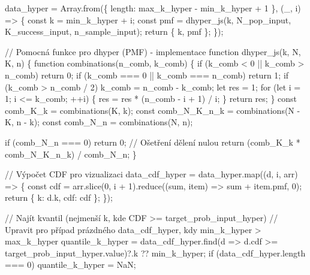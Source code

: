 \documentclass[
  czech,
  11pt,
  letterpaper,
  DIV=11,
  numbers=noendperiod]{scrreprt}
\newenvironment{Shaded}{\begin{snugshade}}{\end{snugshade}}
\newcommand{\NormalTok}[1]{\textcolor[rgb]{0.00,0.23,0.31}{#1}}
\begin{document}
\begin{tcolorbox}
\begin{Shaded}
\begin{Highlighting}[]
\NormalTok{data\_hyper = Array.from(\{ length: max\_k\_hyper {-} min\_k\_hyper + 1 \}, (\_, i) =\textgreater{} \{}
\NormalTok{  const k = min\_k\_hyper + i;}
\NormalTok{  const pmf = dhyper\_js(k, N\_pop\_input, K\_success\_input, n\_sample\_input);}
\NormalTok{  return \{ k, pmf \};}
\NormalTok{\});}

\NormalTok{// Pomocná funkce pro dhyper (PMF) {-} implementace}
\NormalTok{function dhyper\_js(k, N, K, n) \{}
\NormalTok{  function combinations(n\_comb, k\_comb) \{}
\NormalTok{    if (k\_comb \textless{} 0 || k\_comb \textgreater{} n\_comb) return 0;}
\NormalTok{    if (k\_comb === 0 || k\_comb === n\_comb) return 1;}
\NormalTok{    if (k\_comb \textgreater{} n\_comb / 2) k\_comb = n\_comb {-} k\_comb;}
\NormalTok{    let res = 1;}
\NormalTok{    for (let i = 1; i \textless{}= k\_comb; ++i) \{}
\NormalTok{      res = res * (n\_comb {-} i + 1) / i;}
\NormalTok{    \}}
\NormalTok{    return res;}
\NormalTok{  \}}
\NormalTok{  const comb\_K\_k = combinations(K, k);}
\NormalTok{  const comb\_N\_K\_n\_k = combinations(N {-} K, n {-} k);}
\NormalTok{  const comb\_N\_n = combinations(N, n);}
  
\NormalTok{  if (comb\_N\_n === 0) return 0; // Ošetření dělení nulou}
\NormalTok{  return (comb\_K\_k * comb\_N\_K\_n\_k) / comb\_N\_n;}
\NormalTok{\}}

\NormalTok{// Výpočet CDF pro vizualizaci}
\NormalTok{data\_cdf\_hyper = data\_hyper.map((d, i, arr) =\textgreater{} \{}
\NormalTok{  const cdf = arr.slice(0, i + 1).reduce((sum, item) =\textgreater{} sum + item.pmf, 0);}
\NormalTok{  return \{ k: d.k, cdf: cdf \};}
\NormalTok{\});}

\NormalTok{// Najít kvantil (nejmenší k, kde CDF \textgreater{}= target\_prob\_input\_hyper)}
\NormalTok{// Upravit pro případ prázdného data\_cdf\_hyper, kdy min\_k\_hyper \textgreater{} max\_k\_hyper}
\NormalTok{quantile\_k\_hyper = data\_cdf\_hyper.find(d =\textgreater{} d.cdf \textgreater{}= target\_prob\_input\_hyper.value)?.k ?? min\_k\_hyper;}
\NormalTok{if (data\_cdf\_hyper.length === 0) quantile\_k\_hyper = NaN;}



\end{Highlighting}
\end{Shaded}
\end{tcolorbox}
\end{document}
